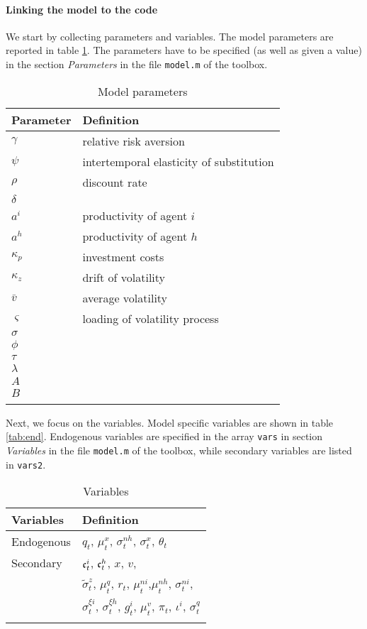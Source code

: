 \documentclass[12pt,english]{article}
\begin{document}
\paragraph{Linking the model to the code} We start by collecting parameters and variables.
The model parameters are reported in table \ref{tab:para}. The parameters have to be specified (as well as given a value) in the section \textit{Parameters} in the file \texttt{model.m} of the toolbox.
\begin{table}
\center
\caption{Model parameters}
\begin{tabular}{ll} \toprule
Parameter & Definition \\ \midrule
$\gamma$ & relative risk aversion\\
$\psi$ & intertemporal elasticity of substitution\\
$\rho$  & discount rate\\ 
$\delta$ & \\ \midrule
$a^i$ & productivity of agent $i$\\
$a^h$ & productivity of agent $h$\\ 
$\kappa_p$ & investment costs \\ \midrule
$\kappa_z$ & drift of volatility \\
$\bar{v}$ & average volatility \\
$\varsigma$ & loading of volatility process \\
$\sigma$ & \\
$\phi$ & \\
$\tau$ & \\
$\lambda$ & \\
$A$ & \\
$B$ & \\ \toprule
\label{tab:para}
\end{tabular}
\end{table}
Next, we focus on the variables. Model specific variables are shown in table \ref{tab:end}. Endogenous variables are specified in the array \texttt{vars} in section \textit{Variables}  in the file \texttt{model.m} of the toolbox, while secondary variables are listed in \texttt{vars2}.
\begin{table}
\center
\caption{Variables}
\begin{tabular}{ll} \toprule
Variables & Definition \\ \midrule
Endogenous & $q_t$, $\mu_t^{x}$, $\sigma_t^{nh}$, $\sigma_t^{x}$, $\theta_t$\\  \midrule
Secondary    & $\frak{c}_t^i$, $\frak{c}_t^h$, $x$, $v$,\\
                     & $\tilde{\sigma}_t^z$, $\mu_t^{q}$, $r_t$, $\mu_t^{ni}$,$\mu_t^{nh}$, $\sigma_t^{ni}$, \\
                     & $\sigma_t^{\xi i}$, $\sigma_t^{\xi h}$, $g_t^i$, $\mu_t^v$, $\pi_t$, $\iota^i$, $\sigma_t^{q}$ \\ \toprule 
\label{tab:var}
\end{tabular}
\end{table}
\end{document}
